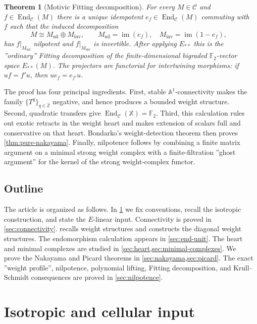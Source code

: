 \documentclass[11pt]{amsart}
\numberwithin{equation}{section}
\newtheorem{theorem}{Theorem}[section]
\theoremstyle{definition}
\theoremstyle{remark}
\DeclareMathOperator{\End}{End}
\newcommand{\F}{\mathbb F_2}
\newcommand{\X}{\mathbb X}
\newcommand{\C}{\mathcal C}
\begin{document}
\begin{theorem}[Motivic Fitting decomposition]
\label{thm:fitting}
For every $M\in\C$ and $f\in\End_{\C}(M)$ there is a unique idempotent
$e_f\in\End_{\C}(M)$ commuting with $f$ such that the induced decomposition
\[
  M\cong M_{\mathrm{nil}}\oplus M_{\mathrm{inv}},
  \qquad
  M_{\mathrm{nil}}=\operatorname{im}(e_f),
  \quad
  M_{\mathrm{inv}}=\operatorname{im}(1-e_f),
\]
has $f|_{M_{\mathrm{nil}}}$ nilpotent and
$f|_{M_{\mathrm{inv}}}$ is invertible.  After applying $E_{**}$ this is the
''ordinary'' Fitting decomposition of the finite-dimensional bigraded
$\F$-vector space $E_{**}(M)$.  The projectors are functorial for
intertwining morphisms: if $uf=f'u$, then $ue_f=e_{f'}u$.
\end{theorem}

The proof has four principal ingredients.  First, stable
$\mathbb A^1$-connectivity makes the family $\{T^q\}_{q\in\mathbb Z}$
negative, and hence produces a bounded weight structure.  Second, quadratic
transfers give $\End_{\C}(\X)=\F$.  Third, this calculation rules out exotic
retracts in the weight heart and makes extension of scalars full and
conservative on that heart.  Bondarko's weight-detection theorem then proves
\cref{thm:pure-nakayama}.  Finally, nilpotence follows by combining a finite
matrix argument on a minimal strong weight complex with a finite-filtration
''ghost argument'' for the kernel of the strong weight-complex functor.

\subsection*{Outline}

The article is organized as follows.  In \cref{sec:isotropic-input} we fix
conventions, recall the isotropic construction, and state the $E$-linear
input.  Connectivity is proved in \cref{sec:connectivity}.
 recalls weight structures and constructs the diagonal
weight structures.  The endomorphism calculation appears in
\cref{sec:end-unit}.  The heart and minimal complexes are studied in
\cref{sec:heart,sec:minimal-complexes}.  We prove the Nakayama and Picard
theorems in \cref{sec:nakayama,sec:picard}.  The exact ''weight profile'',
nilpotence, polynomial lifting, Fitting decomposition, and Krull--Schmidt consequences are
proved in \cref{sec:nilpotence}.

\section{Isotropic and cellular input}\label{sec:isotropic-input}
\end{document}
